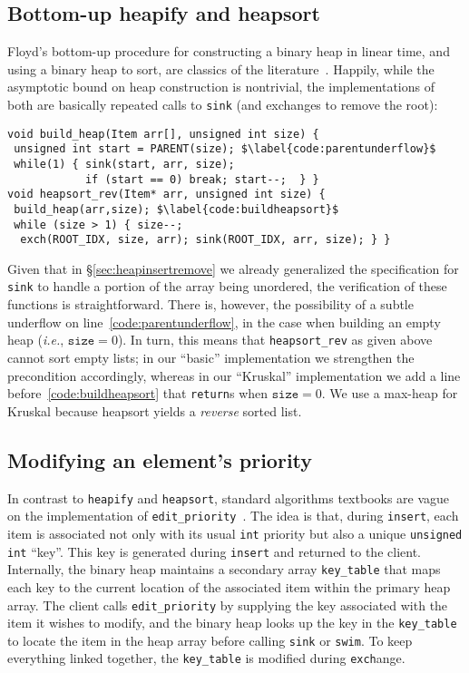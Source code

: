 \lstset{style=myTinyStyle}

\subsection{Bottom-up heapify and heapsort}
\label{sec:heapsort}

Floyd's bottom-up procedure for constructing a binary heap in linear time, and using a binary heap to sort, are classics of the literature~\cite{clrs,sedgewick}.  Happily, while the asymptotic bound on heap construction is nontrivial, the implementations of both are basically repeated calls to \texttt{sink} (and exchanges to remove the root):
\begin{lstlisting}[firstnumber=32]
void build_heap(Item arr[], unsigned int size) {
 unsigned int start = PARENT(size); $\label{code:parentunderflow}$
 while(1) { sink(start, arr, size);
            if (start == 0) break; start--;  } }
void heapsort_rev(Item* arr, unsigned int size) {
 build_heap(arr,size); $\label{code:buildheapsort}$
 while (size > 1) { size--;
  exch(ROOT_IDX, size, arr); sink(ROOT_IDX, arr, size); } }
\end{lstlisting}
Given that in \S\ref{sec:heapinsertremove} we already generalized the specification for \texttt{sink} to handle a portion of the array being unordered, the verification of these functions is straightforward.  There is, however, the possibility of a subtle underflow on line~\ref{code:parentunderflow}, in the case when building an empty heap (\emph{i.e.}, $\texttt{size}=0$).  In turn, this means that \texttt{heapsort\_rev} as given above cannot sort empty lists; in our ``basic'' implementation we strengthen the precondition accordingly, whereas in our ``Kruskal'' implementation we add a line before~\ref{code:buildheapsort} that \texttt{return}s when $\texttt{size}=0$.  We use a max-heap for Kruskal because heapsort yields a \emph{reverse} sorted list.

\subsection{Modifying an element's priority}
\label{sec:modpri}

In contrast to \texttt{heapify} and \texttt{heapsort}, standard algorithms textbooks are vague on the implementation of \texttt{edit\_priority}~\cite{clrs,sedgewick}.  The idea is that, during \texttt{insert}, each item is associated not only with its usual \texttt{int} priority
but also a unique \texttt{unsigned int} ``key''.
This key is generated during \texttt{insert} and returned to the client.
Internally, the binary heap maintains a secondary array \texttt{key\_table} that maps each key to the current location of the associated item within the primary heap array. The client calls \texttt{edit\_priority} by supplying the key associated with the item
it wishes to modify, and the binary heap looks up the key in the \texttt{key\_table} to
locate the item in the heap array before calling \texttt{sink} or \texttt{swim}. To keep everything linked together, the \texttt{key\_table} is modified during \texttt{exch}ange.

